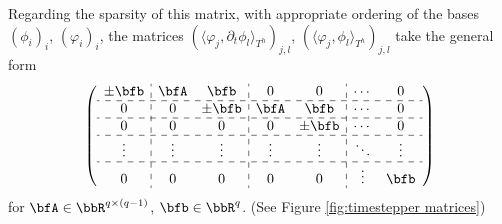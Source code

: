 \begin{example}
        Regarding the sparsity of this matrix, with appropriate ordering of the bases $(\phi_{i})_{i}$, $(\varphi_{i})_{i}$, the matrices $(\langle\varphi_{j}, \partial_{t}\phi_{l}\rangle_{T^{h}})_{j, l}$, $(\langle\varphi_{j}, \phi_{l}\rangle_{T^{h}})_{j, l}$ take the general form
        \begin{equation}\label{eqn:timestepper matrices}
            \left(\begin{array}{ c : c c : c c : c c }
                \pm\bfb  &  \bfA    &  \bfb     &  0       &  0        &  \cdots   &  0        \\
                \hdashline
                0        &  0       &  \pm\bfb  &  \bfA    &  \bfb     &  \cdots   &  0        \\
                \hdashline
                0        &  0       &  0        &  0       &  \pm\bfb  &  \cdots   &  0        \\
                \hdashline
                \vdots   &  \vdots  &  \vdots   &  \vdots  &  \vdots   &  \ddots   &  \vdots   \\
                \hdashline
                0        &  0       &  0        &  0       &  0        &  \vdots   &  \bfb     \\
            \end{array}\right)
        \end{equation}
        for $\bfA  \in  \bbR^{q\times (q - 1)}$, $\bfb  \in  \bbR^{q}$. (See Figure \ref{fig:timestepper matrices}) 


\end{example}
